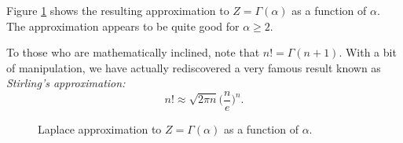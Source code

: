 \documentclass{article}
\begin{document}
Figure \ref{problem_5} shows the resulting approximation to $Z =
\Gamma(\alpha)$ as a function of $\alpha$.  The approximation
appears to be quite good for $\alpha \geq 2$.

To those who are mathematically inclined, note that $n! = \Gamma(n +
1)$.  With a bit of manipulation, we have actually rediscovered a very
famous result known as \emph{Stirling's approximation:}
\begin{equation*}
  n!
  \approx
  \sqrt{2\pi n}
  \biggl(\frac{n}{e}\biggr)^n.
\end{equation*}

\begin{figure}
  \centering
  
  \caption{Laplace approximation to $Z = \Gamma(\alpha)$ as a function
    of $\alpha$.}
  \label{problem_5}
\end{figure}
\end{document}
